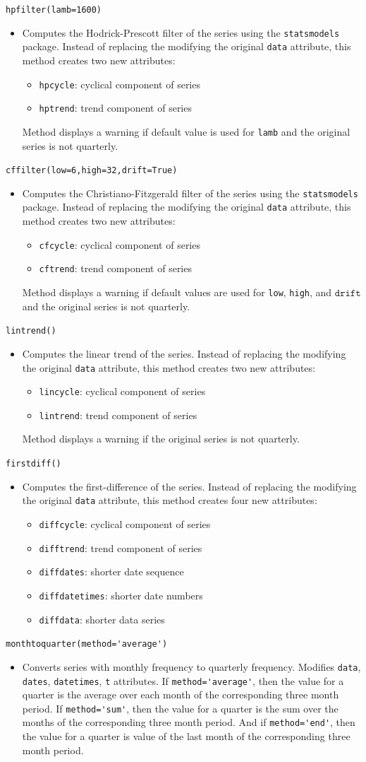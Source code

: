 \documentclass[11pt,fleqn]{article}
\newcommand{\IZ}{\begin{itemize}}
\newcommand{\ZI}{\end{itemize}}
\newcommand{\itemb}{\item[]}
\newcommand{\ttt}{\texttt}
\begin{document}
	\itemb \ttt{hpfilter(lamb=1600)}
		\IZ
		\itemb Computes the Hodrick-Prescott filter of the series using the \ttt{statsmodels} package. Instead of replacing the modifying the original \ttt{data} attribute, this method creates two new attributes:
			\IZ
            \itemb \ttt{hpcycle}: cyclical component of series
            \itemb \ttt{hptrend}: trend component of series
            \ZI
		Method displays a warning if default value is used for \ttt{lamb} and the original series is not quarterly.
        \ZI
		
	\itemb \ttt{cffilter(low=6,high=32,drift=True)}
		\IZ
		\itemb Computes the Christiano-Fitzgerald filter of the series using the \ttt{statsmodels} package. Instead of replacing the modifying the original \ttt{data} attribute, this method creates two new attributes:
			\IZ
            \itemb \ttt{cfcycle}: cyclical component of series
            \itemb \ttt{cftrend}: trend component of series
            \ZI
		Method displays a warning if default values are used for \ttt{low}, \ttt{high}, and $\ttt{drift}$ and the original series is not quarterly.
        \ZI
	
	\itemb \ttt{lintrend()}
		\IZ
		\itemb Computes the linear trend of the series. Instead of replacing the modifying the original \ttt{data} attribute, this method creates two new attributes:
			\IZ
            \itemb \ttt{lincycle}: cyclical component of series
            \itemb \ttt{lintrend}: trend component of series
            \ZI
		Method displays a warning if the original series is not quarterly.
        \ZI
		
	\itemb \ttt{firstdiff()}
		\IZ
		\itemb Computes the first-difference of the series. Instead of replacing the modifying the original \ttt{data} attribute, this method creates four new attributes:
			\IZ
            \itemb \ttt{diffcycle}: cyclical component of series
            \itemb \ttt{difftrend}: trend component of series
            \itemb \ttt{diffdates}: shorter date sequence
            \itemb \ttt{diffdatetimes}: shorter date numbers
            \itemb \ttt{diffdata}: shorter data series
            \ZI
        \ZI
		
	\itemb \verb!monthtoquarter(method='average')!
		\IZ
		\itemb Converts series with monthly frequency to quarterly frequency. Modifies \ttt{data}, \ttt{dates}, \ttt{datetimes}, \ttt{t} attributes. If \verb!method='average'!, then the value for a quarter is the average over each month of the corresponding three month period. If \verb!method='sum'!, then the value for a quarter is the sum over the months of the corresponding three month period. And if \verb!method='end'!, then the value for a quarter is value of the last  month of the corresponding three month period. 
		\ZI		
	
\end{document}
